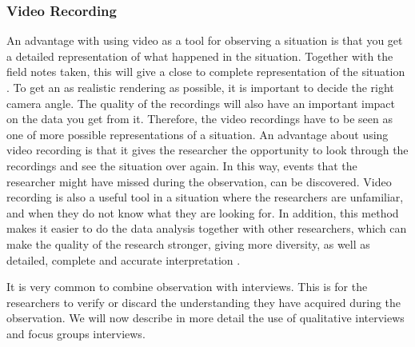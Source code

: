 \subsubsection{Video Recording}
An advantage with using video as a tool for observing a situation is that you get a detailed representation of what happened in the situation. Together with the field notes taken, this will give a close to complete representation of the situation \cite{tjora}. To get an as realistic rendering as possible, it is important to decide the right camera angle. The quality of the recordings will also have an important impact on the data you get from it. Therefore, the video recordings have to be seen as one of more possible representations of a situation.  An advantage about using video recording is that it gives the researcher the opportunity to look through the recordings and see the situation over again. In this way, events that the researcher might have missed during the observation, can be discovered. Video recording is also a useful tool in a situation where the researchers are unfamiliar, and when they do not know what they are looking for. In addition, this method makes it easier to do the data analysis together with other researchers, which can make the quality of the research stronger, giving more diversity, as well as detailed, complete and accurate interpretation \cite{tjora}.

It is very common to combine observation with interviews. This is for the researchers to verify or discard the understanding they have acquired during the observation. We will now describe in more detail the use of qualitative interviews and focus groups interviews. 

